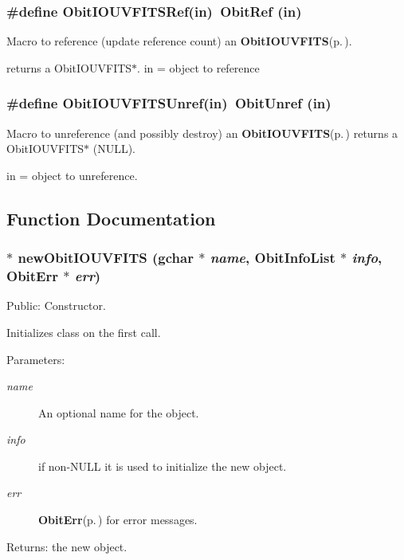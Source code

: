 \subsubsection{\setlength{\rightskip}{0pt plus 5cm}\#define Obit\-IOUVFITSRef(in)\ Obit\-Ref (in)}\label{ObitIOUVFITS_8h_a1}


Macro to reference (update reference count) an {\bf Obit\-IOUVFITS}{\rm (p.\,\pageref{structObitIOUVFITS})}. 

returns a Obit\-IOUVFITS$\ast$. in = object to reference 
\subsubsection{\setlength{\rightskip}{0pt plus 5cm}\#define Obit\-IOUVFITSUnref(in)\ Obit\-Unref (in)}\label{ObitIOUVFITS_8h_a0}


Macro to unreference (and possibly destroy) an {\bf Obit\-IOUVFITS}{\rm (p.\,\pageref{structObitIOUVFITS})} returns a Obit\-IOUVFITS$\ast$ (NULL). 

in = object to unreference. 

\subsection{Function Documentation}
\subsubsection{$\ast$ new\-Obit\-IOUVFITS (gchar $\ast$ {\em name}, {\bf Obit\-Info\-List} $\ast$ {\em info}, {\bf Obit\-Err} $\ast$ {\em err})}\label{ObitIOUVFITS_8h_a4}


Public: Constructor. 

Initializes class on the first call. \begin{Desc}
\item[Parameters:]
\begin{description}
\item[{\em name}]An optional name for the object. \item[{\em info}]if non-NULL it is used to initialize the new object. \item[{\em err}]{\bf Obit\-Err}{\rm (p.\,\pageref{structObitErr})} for error messages. \end{description}
\end{Desc}
\begin{Desc}
\item[Returns:]the new object. \end{Desc}
